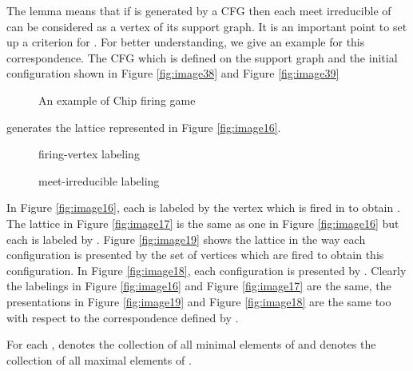 \documentclass{article}
\theoremstyle{definition}
\begin{document}
The lemma means that if  is generated by a CFG then each meet irreducible of  can be considered as a vertex of its support graph. It is an important point to set up a criterion for . For better understanding, we give an example for this correspondence. The CFG which is defined on the support graph and the initial configuration shown in Figure \ref{fig:image38} and Figure \ref{fig:image39}
\begin{figure}
\centering
{}
\quad
{}
\caption{An example of Chip firing game}
\end{figure}
\noindent generates the lattice represented in Figure \ref{fig:image16}.\begin{figure}
\centering
{}
\quad
{}
\caption{firing-vertex labeling}
\end{figure}
\begin{figure}
\centering
{}
\quad
{}
\caption{meet-irreducible labeling}
\end{figure}
\noindent In Figure \ref{fig:image16}, each  is labeled by the vertex which is fired in  to obtain . The lattice in Figure \ref{fig:image17} is the same as one in Figure \ref{fig:image16} but each  is labeled by . Figure \ref{fig:image19} shows the lattice in the way each configuration is presented by the set of vertices which are fired to obtain this configuration. In Figure \ref{fig:image18}, each configuration  is presented by .  Clearly the labelings in Figure \ref{fig:image16} and Figure \ref{fig:image17} are the same, the presentations in Figure \ref{fig:image19} and Figure \ref{fig:image18} are the same too with respect to the correspondence  defined by .

For each ,  denotes the collection of all minimal elements of  and  denotes the collection of all maximal elements of . 
\end{document}
